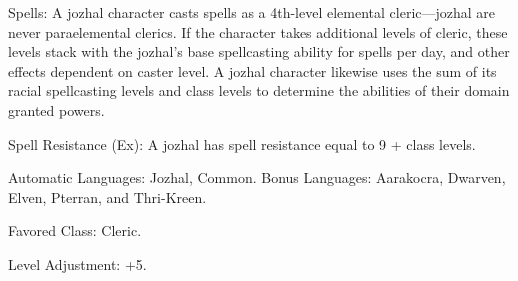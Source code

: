 \begin{itemize*}
    \item Spells: A jozhal character casts spells as a 4th-level elemental cleric---jozhal are never paraelemental clerics. If the character takes additional levels of cleric, these levels stack with the jozhal's base spellcasting ability for spells per day, and other effects dependent on caster level. A jozhal character likewise uses the sum of its racial spellcasting levels and class levels to determine the abilities of their domain granted powers.
    \item Spell Resistance (Ex): A jozhal has spell resistance equal to 9 + class levels.
    \item Automatic Languages: Jozhal, Common. Bonus Languages: Aarakocra, Dwarven, Elven, Pterran, and Thri-Kreen.
    \item Favored Class: Cleric.
    \item Level Adjustment: +5.
\end{itemize*}
